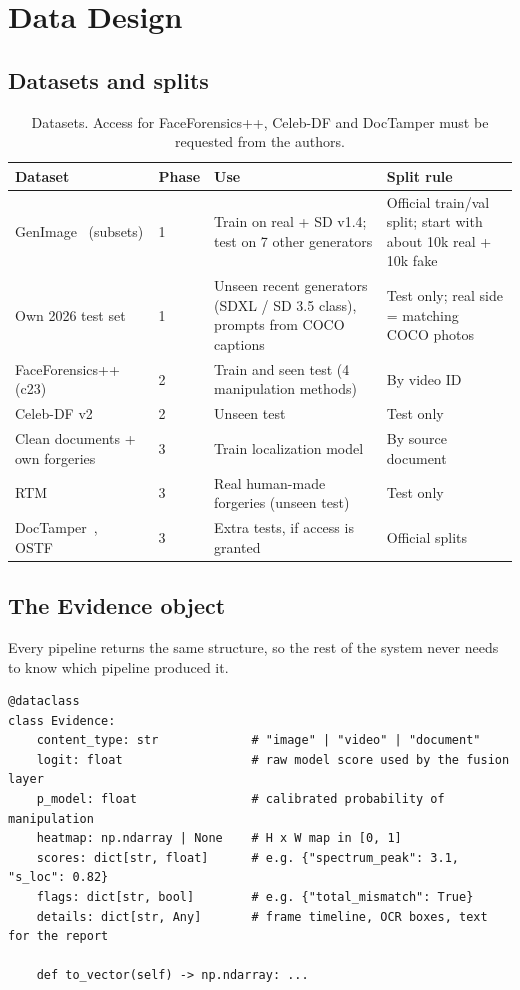 \documentclass[11pt,a4paper]{article}
\begin{document}
\section{Data Design}
\label{sec:data}

\subsection{Datasets and splits}
\begin{table}[htbp]
\centering
\small
\begin{tabularx}{\linewidth}{@{}l l Y Y@{}}
\toprule
\textbf{Dataset} & \textbf{Phase} & \textbf{Use} & \textbf{Split rule} \\
\midrule
GenImage~\cite{genimage} (subsets) & 1 & Train on real + SD v1.4; test on 7 other generators & Official train/val split; start with about 10k real + 10k fake \\
Own 2026 test set & 1 & Unseen recent generators (SDXL / SD 3.5 class), prompts from COCO captions & Test only; real side = matching COCO photos \\
FaceForensics++~\cite{ffpp} (c23) & 2 & Train and seen test (4 manipulation methods) & By video ID \\
Celeb-DF v2~\cite{celebdf} & 2 & Unseen test & Test only \\
Clean documents + own forgeries & 3 & Train localization model & By source document \\
RTM~\cite{rtm} & 3 & Real human-made forgeries (unseen test) & Test only \\
DocTamper~\cite{doctamper}, OSTF~\cite{ostf} & 3 & Extra tests, if access is granted & Official splits \\
\bottomrule
\end{tabularx}
\caption{Datasets. Access for FaceForensics++, Celeb-DF and DocTamper must be requested from the authors.}
\label{tab:datasets}
\end{table}

\subsection{The Evidence object}
\label{sec:evidence-object}
Every pipeline returns the same structure, so the rest of the system never needs to know which
pipeline produced it.

{\small
\begin{verbatim}
@dataclass
class Evidence:
    content_type: str             # "image" | "video" | "document"
    logit: float                  # raw model score used by the fusion layer
    p_model: float                # calibrated probability of manipulation
    heatmap: np.ndarray | None    # H x W map in [0, 1]
    scores: dict[str, float]      # e.g. {"spectrum_peak": 3.1, "s_loc": 0.82}
    flags: dict[str, bool]        # e.g. {"total_mismatch": True}
    details: dict[str, Any]       # frame timeline, OCR boxes, text for the report

    def to_vector(self) -> np.ndarray: ...
\end{verbatim}
}
\end{document}
